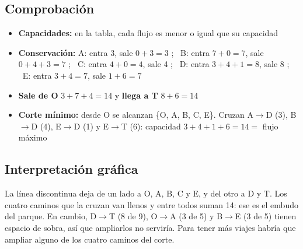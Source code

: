 \documentclass[11pt,a4paper]{article}
\newcommand{\ar}[4][arco]{\draw[#1] (#2) to node[etq, lbl] {#4} (#3);}
\newcommand{\nodosSeervada}{%
  \node[fuente]   (O) at (0,-2)     {O};
  \node[nodo]     (A) at (1.5,-0.6) {A};
  \node[nodo]     (B) at (2,-2)     {B};
  \node[nodo]     (C) at (1.5,-3.4) {C};
  \node[nodo]     (D) at (3.6,-0.9) {D};
  \node[nodo]     (E) at (3.6,-3.1) {E};
  \node[sumidero] (T) at (5,-2)     {T};}
\begin{document}
\subsection*{Comprobación}
\begin{itemize}[itemsep=2pt]
  \item \textbf{Capacidades:} en la tabla, cada flujo es menor o igual que su capacidad \checkmark
  \item \textbf{Conservación:}
        A: entra 3, sale $0 + 3 = 3$ \checkmark; \
        B: entra $7 + 0 = 7$, sale $0 + 4 + 3 = 7$ \checkmark; \
        C: entra $4 + 0 = 4$, sale 4 \checkmark; \
        D: entra $3 + 4 + 1 = 8$, sale 8 \checkmark; \
        E: entra $3 + 4 = 7$, sale $1 + 6 = 7$ \checkmark
  \item \textbf{Sale de O} $3 + 7 + 4 = 14$ y \textbf{llega a T} $8 + 6 = 14$ \checkmark
  \item \textbf{Corte mínimo:} desde O se alcanzan \{O, A, B, C, E\}. Cruzan A$\to$D (3), B$\to$D (4),
        E$\to$D (1) y E$\to$T (6): capacidad $3 + 4 + 1 + 6 = 14 =$ flujo máximo \checkmark
\end{itemize}

\subsection*{Interpretación gráfica}
\begin{center}
\end{center}
La línea discontinua deja de un lado a O, A, B, C y E, y del otro a D y T. Los cuatro caminos que la cruzan van
llenos y entre todos suman 14: ese es el embudo del parque. En cambio, D$\to$T (8 de 9), O$\to$A (3 de 5) y
B$\to$E (3 de 5) tienen espacio de sobra, así que ampliarlos no serviría. Para tener más viajes habría que ampliar
alguno de los cuatro caminos del corte.
\end{document}
